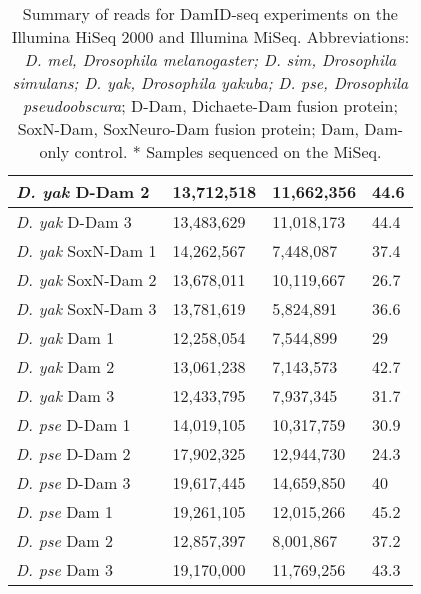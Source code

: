 \begin{table}[h]
\begin{tabular}{|l|l|l|l|}
\emph{D. yak} D-Dam 2     & 13,712,518  & 11,662,356   & 44.6               \\ \hline
\emph{D. yak} D-Dam 3     & 13,483,629  & 11,018,173   & 44.4               \\ \hline
\emph{D. yak} SoxN-Dam 1  & 14,262,567  & 7,448,087    & 37.4               \\ \hline
\emph{D. yak} SoxN-Dam 2  & 13,678,011  & 10,119,667   & 26.7               \\ \hline
\emph{D. yak} SoxN-Dam 3  & 13,781,619  & 5,824,891    & 36.6               \\ \hline
\emph{D. yak} Dam 1       & 12,258,054  & 7,544,899    & 29                 \\ \hline
\emph{D. yak} Dam 2       & 13,061,238  & 7,143,573    & 42.7               \\ \hline
\emph{D. yak} Dam 3       & 12,433,795  & 7,937,345    & 31.7               \\ \hline
\emph{D. pse} D-Dam 1     & 14,019,105  & 10,317,759   & 30.9               \\ \hline
\emph{D. pse} D-Dam 2     & 17,902,325  & 12,944,730   & 24.3               \\ \hline
\emph{D. pse} D-Dam 3     & 19,617,445  & 14,659,850   & 40                 \\ \hline
\emph{D. pse} Dam 1       & 19,261,105  & 12,015,266   & 45.2               \\ \hline
\emph{D. pse} Dam 2       & 12,857,397  & 8,001,867    & 37.2               \\ \hline
\emph{D. pse} Dam 3       & 19,170,000  & 11,769,256   & 43.3               \\ \hline
\end{tabular}
\caption{Summary of reads for DamID-seq experiments on the Illumina HiSeq 2000 and Illumina MiSeq. Abbreviations: \emph{D. mel, Drosophila melanogaster; D. sim, Drosophila simulans; D. yak, Drosophila yakuba; D. pse, Drosophila pseudoobscura}; D-Dam, Dichaete-Dam fusion protein; SoxN-Dam, SoxNeuro-Dam fusion protein; Dam, Dam-only control. * Samples sequenced on the MiSeq.}
\label{Table 4.1}
\end{table}

